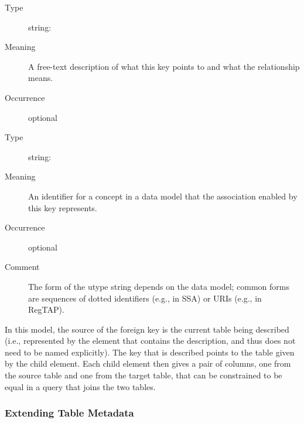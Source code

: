\documentclass[11pt,a4paper]{ivoa}
\begin{document}
\begin{generated}
\begin{bigdescription}
\begin{description}
\end{description}
\item[Element \xmlel{description}]
\begin{description}
\item[Type] string: 
\item[Meaning] A free-text description of what this key points to
                  and what the relationship means.
\item[Occurrence] optional

\end{description}
\item[Element \xmlel{utype}]
\begin{description}
\item[Type] string: 
\item[Meaning] An identifier for a concept in a data model that
                  the association enabled by this key represents.
\item[Occurrence] optional
\item[Comment] The form of the utype string depends on the data
                  model; common forms are sequences of dotted identifiers
                  (e.g., in SSA) or URIs (e.g., in RegTAP).

\end{description}


\end{bigdescription}\endgroup

\endgroup
\end{generated}



In this model, the source of the foreign
key is the current table being described (i.e., represented by the
 element that contains the
 description, and thus does not need to be
named explicitly).  The key that is described points to the table
given by the  child element.  Each child
 element then gives a pair of columns, one
from the source table and one from the target table, that can be
constrained to be equal in a query that joins the two tables.






\subsubsection{Extending Table Metadata}
\label{sect:tblext}
\end{document}
